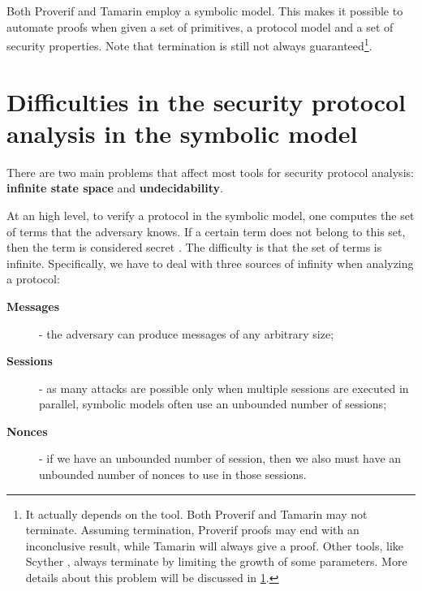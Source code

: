 Both Proverif and Tamarin employ a symbolic model. This makes it possible to automate proofs when given a set of primitives, a protocol model and a set of security properties. Note that termination is still not always guaranteed\footnote{It actually depends on the tool. Both Proverif and Tamarin may not terminate. Assuming termination, Proverif proofs may end with an inconclusive result, while Tamarin will always give a proof. Other tools, like Scyther \cite{Scyther}, always terminate by limiting the growth of some parameters. More details about this problem will be discussed in \cref{sec:difficulties-analysis-symbolic}.}. %

\section{Difficulties in the security protocol analysis in the symbolic model}
\label{sec:difficulties-analysis-symbolic}
There are two main problems that affect most tools for security protocol analysis: \textbf{infinite state space} and \textbf{undecidability}.

At an high level, to verify a protocol in the symbolic model, one computes the set of terms that the adversary knows. If a certain term does not belong to this set, then the term is considered secret \cite{SymbolicVerificationBlanchet}. The difficulty is that the set of terms is infinite. Specifically, we have to deal with three sources of infinity when analyzing a protocol:
\begin{description}
    \item[\textbf{Messages}] - the adversary can produce messages of any arbitrary size;
    \item[\textbf{Sessions}] - as many attacks are possible only when multiple sessions are executed in parallel, symbolic models often use an unbounded number of sessions;
    \item[\textbf{Nonces}] - if we have an unbounded number of session, then we also must have an unbounded number of nonces to use in those sessions.
\end{description}


